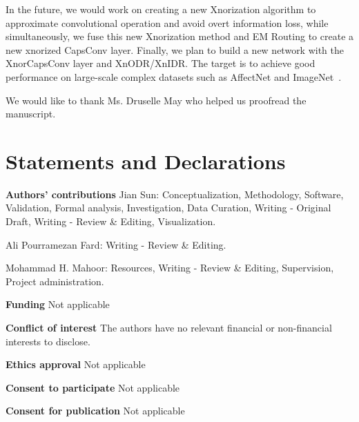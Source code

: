 \documentclass[sn-mathphys,iicol,Numbered]{sn-jnl}
\begin{document}
In the future, we would work on creating a new Xnorization algorithm to approximate convolutional operation and avoid overt information loss, while simultaneously, we fuse this new Xnorization method and EM Routing \citep{A3_emr} to create a new xnorized CapsConv layer. Finally, we plan to build a new network with the XnorCapsConv layer and XnODR/XnIDR. The target is to achieve good performance on large-scale complex datasets such as AffectNet \citep{A52_affnet} and ImageNet~\citep{A48_img_net}.

\backmatter


We would like to thank Ms. Druselle May who helped us proofread the manuscript.

\section*{Statements and Declarations}

\textbf{Authors' contributions} Jian Sun: Conceptualization, Methodology, Software, Validation, Formal analysis, Investigation, Data Curation, Writing - Original Draft, Writing - Review \& Editing, Visualization.

Ali Pourramezan Fard: Writing - Review \& Editing.

Mohammad H. Mahoor: Resources, Writing - Review \& Editing, Supervision, Project administration.

\textbf{Funding} Not applicable

\textbf{Conflict of interest} The authors have no relevant financial or non-financial interests to disclose.

\textbf{Ethics approval} Not applicable

\textbf{Consent to participate} Not applicable

\textbf{Consent for publication} Not applicable
\end{document}
